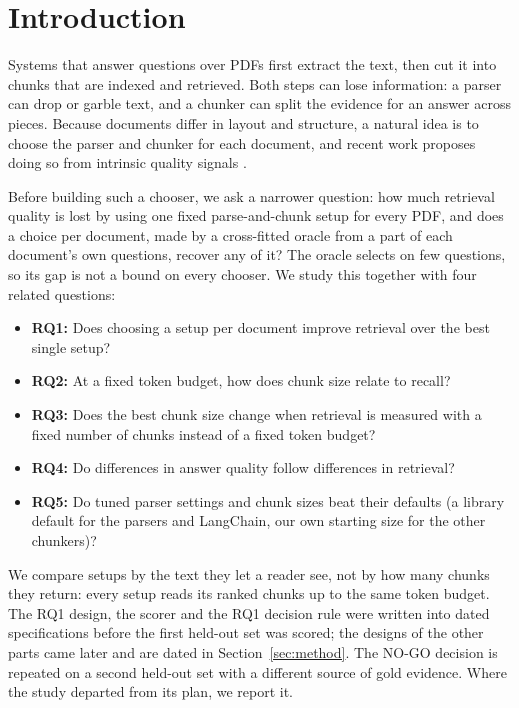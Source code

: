 \section{Introduction}\label{sec:intro}

Systems that answer questions over PDFs first extract the text, then cut it
into chunks that are indexed and retrieved. Both steps can lose information:
a parser can drop or garble text, and a chunker can split the evidence for an
answer across pieces. Because documents differ in layout and structure, a
natural idea is to choose the parser and chunker for each document, and recent
work proposes doing so from intrinsic quality signals
\cite{demourajunior2026adaptive}.

Before building such a chooser, we ask a narrower question: how much
retrieval quality is lost by using one fixed parse-and-chunk setup for every
PDF, and does a choice per document, made by a cross-fitted oracle from a part
of each document's own questions, recover any of it? The oracle selects on few
questions, so its gap is not a bound on every chooser. We study this together with
four related questions:
\begin{itemize}
\item \textbf{RQ1:} Does choosing a setup per document improve retrieval over
the best single setup?
\item \textbf{RQ2:} At a fixed token budget, how does chunk size relate to
recall?
\item \textbf{RQ3:} Does the best chunk size change when retrieval is measured
with a fixed number of chunks instead of a fixed token budget?
\item \textbf{RQ4:} Do differences in answer quality follow differences in
retrieval?
\item \textbf{RQ5:} Do tuned parser settings and chunk sizes beat their
defaults (a library default for the parsers and LangChain, our own starting
size for the other chunkers)?
\end{itemize}

We compare setups by the text they let a reader see, not by how many chunks
they return: every setup reads its ranked chunks up to the same token budget.
The RQ1 design, the scorer and the RQ1 decision rule were written into dated
specifications before the first held-out set was scored; the designs of the
other parts came later and are dated in Section~\ref{sec:method}. The NO-GO
decision is repeated on a second held-out set with a different source of gold
evidence.
Where the study departed from its plan, we report it.

